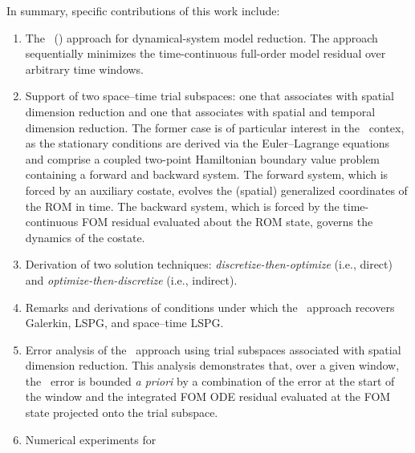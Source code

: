\documentclass[3p,computermodern,10pt]{elsarticle}
\begin{document}
 In summary, specific contributions of this work include:
\begin{enumerate}
\item The \methodNameLower\ (\methodAcronym) approach for dynamical-system
	model reduction. The approach sequentially minimizes the time-continuous
		full-order model residual over arbitrary time windows.
\item Support of two space--time trial subspaces: one that associates with spatial dimension reduction and 
    one that associates with spatial and temporal dimension reduction.
The former case is of particular
		interest in the \methodAcronym\  contex, as the stationary conditions are
		derived via the Euler--Lagrange equations and comprise a coupled two-point
		Hamiltonian boundary value problem containing a forward and backward
		system. The forward system, which is forced by an auxiliary costate,
		evolves the (spatial) generalized coordinates of the ROM in time. The
		backward system, which is forced by the time-continuous FOM residual
		evaluated about the ROM state, governs the dynamics of the costate. 
	\item Derivation of two solution techniques:
		\textit{discretize-then-optimize} (i.e., direct) and
		\textit{optimize-then-discretize} (i.e., indirect). 
	\item Remarks and derivations of conditions under which the
		\methodAcronym\ approach recovers Galerkin, LSPG, and space--time LSPG.
\item Error analysis of the \methodAcronym\ approach using
	trial subspaces associated with spatial dimension reduction.
	This analysis demonstrates that, over a given window, the \methodAcronymROMs\ error 
		is bounded \textit{a priori} by a combination of the
		error at the start of the window and the integrated FOM ODE residual
		evaluated at the FOM state projected onto the trial subspace. 
\item Numerical experiments for 

\end{enumerate}
\end{document}
